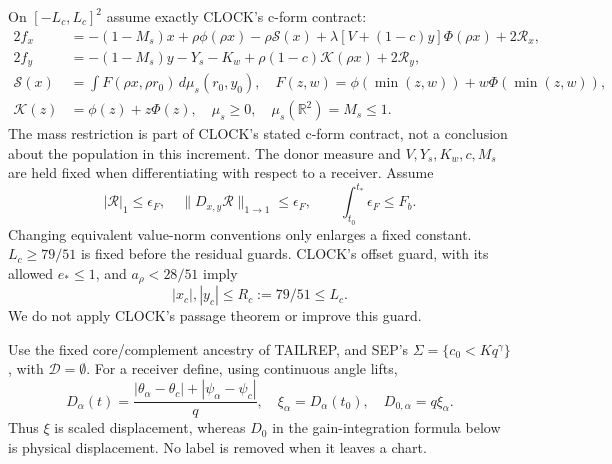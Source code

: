 \documentclass[11pt]{article}
\theoremstyle{remark}\newtheorem{remark}[proposition]{Remark}
\newcommand{\dd}{\,d}
\newcommand{\cR}{\mathcal R}
\begin{document}
On $[-L_c,L_c]^2$ assume exactly CLOCK's c-form contract:
\begin{align}
 2f_x&=-(1-M_s)x+\rho\phi(\rho x)-\rho\mathcal S(x)
       +\lambda[V+(1-c)y]\Phi(\rho x)+2\cR_x,\nonumber\\
 2f_y&=-(1-M_s)y-Y_s-K_w+\rho(1-c)\mathcal K(\rho x)
       +2\cR_y,\label{an03decgv1:cform}\\
 \mathcal S(x)&=\int F(\rho x,\rho r_0)\dd\mu_s(r_0,y_0),\quad
 F(z,w)=\phi(\min(z,w))+w\Phi(\min(z,w)),\nonumber\\
 \mathcal K(z)&=\phi(z)+z\Phi(z),\quad
 \mu_s\ge0,\quad \mu_s(\mathbb R^2)=M_s\le1.\nonumber
\end{align}
The mass restriction is part of CLOCK's stated c-form contract,
not a conclusion about the population in this increment.
The donor measure and $V,Y_s,K_w,c,M_s$ are held fixed when
differentiating with respect to a receiver. Assume
\[
 |\cR|_1\le\epsilon_F,\quad
 \|D_{x,y}\cR\|_{1\to1}\le\epsilon_F,\qquad
 \int_{t_0}^{t_*}\epsilon_F\le F_b.
\]
Changing equivalent value-norm conventions only enlarges a fixed
constant. $L_c\ge79/51$ is fixed before the residual guards.
CLOCK's offset guard, with its allowed $e_*\le1$, and
$a_\rho<28/51$ imply
\begin{equation}
 |x_c|,|y_c|\le R_c:=79/51\le L_c.
 \label{an03decgv1:reference}
\end{equation}
We do not apply CLOCK's passage theorem or improve this guard.

Use the fixed core/complement ancestry of TAILREP, and SEP's
$\Sigma=\{c_0<Kq^\gamma\}$, with $\mathcal D=\emptyset$.
For a receiver define, using continuous angle lifts,
\[
 D_\alpha(t)=\frac{|\theta_\alpha-\theta_c|
                         +|\psi_\alpha-\psi_c|}{q},\quad
 \xi_\alpha=D_\alpha(t_0),\quad D_{0,\alpha}=q\xi_\alpha.
\]
Thus $\xi$ is scaled displacement, whereas $D_0$ in the
gain-integration formula below is physical displacement.
No label is removed when it leaves a chart.
\end{document}
